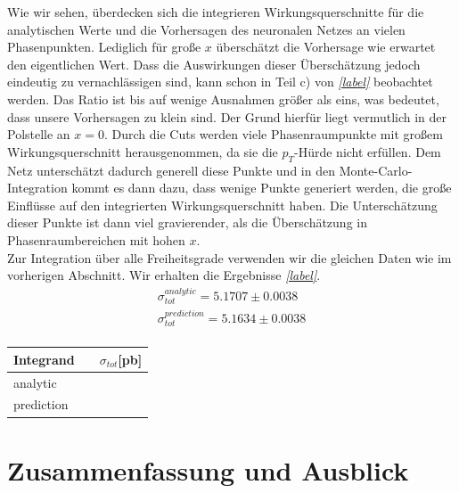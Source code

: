 Wie wir sehen, überdecken sich die integrieren Wirkungsquerschnitte für die analytischen Werte und die Vorhersagen des neuronalen Netzes an vielen Phasenpunkten. Lediglich für große $x$ überschätzt die Vorhersage wie erwartet den eigentlichen Wert. Dass die Auswirkungen dieser Überschätzung jedoch eindeutig zu vernachlässigen sind, kann schon in Teil c) von \textit{\autoref{label}} beobachtet werden. Das Ratio ist bis auf wenige Ausnahmen größer als eins, was bedeutet, dass unsere Vorhersagen zu klein sind. Der Grund hierfür liegt vermutlich in der Polstelle an $x=0$. Durch die Cuts werden viele Phasenraumpunkte mit großem Wirkungsquerschnitt herausgenommen, da sie die $p_T$-Hürde nicht erfüllen. Dem Netz unterschätzt dadurch generell diese Punkte und in den Monte-Carlo-Integration kommt es dann dazu, dass wenige Punkte generiert werden, die große Einflüsse auf den integrierten Wirkungsquerschnitt haben. Die Unterschätzung dieser Punkte ist dann viel gravierender, als die Überschätzung in Phasenraumbereichen mit hohen $x$. \\
\newline
Zur Integration über alle Freiheitsgrade verwenden wir die gleichen Daten wie im vorherigen Abschnitt. Wir erhalten die Ergebnisse \textit{\autoref{label}}.
\begin{equation}
	\begin{split}
	\sigma_{tot}^{analytic} =  5.1707 \pm 0.0038 \\
	\sigma_{tot}^{prediction} = 5.1634 \pm 0.0038 \\
	\end{split}
\end{equation}
\begin{table}
	\centering
	\begin{tabular}{lll}
		Integrand & \multicolumn{2}{l}{$\quad \sigma_{tot}$[pb]} \\
		\hline
		analytic & & \\
		prediction & & \\
	\end{tabular}
\end{table}
\chapter{Zusammenfassung und Ausblick}
